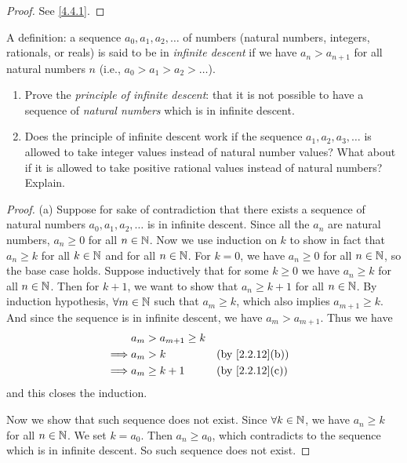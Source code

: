 \begin{proof}
  See \cref{4.4.1}.
\end{proof}

\begin{ex}\label{ex:4.4.2}
  A definition: a sequence \(a_0, a_1, a_2, \dots\) of numbers (natural numbers, integers, rationals, or reals) is said to be in \emph{infinite descent} if we have \(a_n > a_{n + 1}\) for all natural numbers \(n\)
  (i.e., \(a_0 > a_1 > a_2 > \dots\)).
  \begin{enumerate}
    \item Prove the \emph{principle of infinite descent}:
          that it is not possible to have a sequence of \emph{natural numbers} which is in infinite descent.
    \item Does the principle of infinite descent work if the sequence \(a_1, a_2, a_3, \dots\) is allowed to take integer values instead of natural number values?
          What about if it is allowed to take positive rational values instead of natural numbers?
          Explain.
  \end{enumerate}
\end{ex}

\begin{proof}{(a)}
  Suppose for sake of contradiction that there exists a sequence of natural numbers \(a_0, a_1, a_2, \dots\) is in infinite descent.
  Since all the \(a_n\) are natural numbers, \(a_n \geq 0\) for all \(n \in \mathbb{N}\).
  Now we use induction on \(k\) to show in fact that \(a_n \geq k\) for all \(k \in \mathbb{N}\) and for all \(n \in \mathbb{N}\).
  For \(k = 0\), we have \(a_n \geq 0\) for all \(n \in \mathbb{N}\), so the base case holds.
  Suppose inductively that for some \(k \geq 0\) we have \(a_n \geq k\) for all \(n \in \mathbb{N}\).
  Then for \(k + 1\), we want to show that \(a_n \geq k + 1\) for all \(n \in \mathbb{N}\).
  By induction hypothesis, \(\forall m \in \mathbb{N}\) such that \(a_m \geq k\), which also implies \(a_{m + 1} \geq k\).
  And since the sequence is in infinite descent, we have \(a_m > a_{m + 1}\).
  Thus we have
  \begin{align*}
             & a_m > a_{m + 1} \geq k                     \\
    \implies & a_m > k                &  & \by{2.2.12}[b] \\
    \implies & a_m \geq k + 1         &  & \by{2.2.12}[c]
  \end{align*}
  and this closes the induction.

  Now we show that such sequence does not exist.
  Since \(\forall k \in \mathbb{N}\), we have \(a_n \geq k\) for all \(n \in \mathbb{N}\).
  We set \(k = a_0\).
  Then \(a_n \geq a_0\), which contradicts to the sequence which is in infinite descent.
  So such sequence does not exist.
\end{proof}

